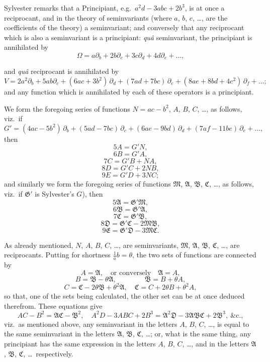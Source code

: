 \documentclass[11pt]{article}
\begin{document}
Sylvester remarks that a Principiant, e.g.\ $a^2 d - 3 a b c + 2 b^3$, is at once a reciprocant, and in the theory of seminvariants (where $a$, $b$, $c$, \ldots, are the coefficients of the theory) a seminvariant; and conversely that any reciprocant which is also a seminvariant is a principiant: \emph{qu\^a} seminvariant, the principiant is annihilated by
\[
\Omega = a\partial_b + 2 b\partial_c + 3 c\partial_d + 4 d\partial_e + \ldots,
\]

and \emph{qu\^a} reciprocant is annihilated by
\[
V = 2 a^2\partial_b + 5 a b\partial_c + (6 a c + 3 b^2)\,\partial_d + (7 a d + 7 b c)\,\partial_e + (8 a e + 8 b d + 4 c^2)\,\partial_f + \ldots;
\]
and any function which is annihilated by each of these operators is a principiant.

We form the foregoing series of functions $N = a c - b^2$, $A$, $B$, $C$, \ldots, as follows, viz.\ if
\[
G' = (4 a c - 5 b^2)\,\partial_b + (5 a d - 7 b c)\,\partial_c + (6 a e - 9 b d)\,\partial_d + (7 a f - 11 b e)\,\partial_e + \ldots,
\]
then
\[
5 A = G' N,
\]
\[
6 B = G' A,
\]
\[
7 C = G' B + N A,
\]
\[
8 D = G' C + 2 N B,
\]
\[
9 E = G' D + 3 N C;
\]
and similarly we form the foregoing series of functions $\mathfrak{M}$, $\mathfrak{A}$, $\mathfrak{B}$, $\mathfrak{C}$, \ldots, as follows, viz.\ if
$\mathfrak{G}'$ is Sylvester's $G$), then
\[
5\mathfrak{A} = \mathfrak{G}'\mathfrak{M},
\]
\[
6\mathfrak{B} = \mathfrak{G}'\mathfrak{A},
\]
\[
7\mathfrak{C} = \mathfrak{G}'\mathfrak{B},
\]
\[
8\mathfrak{D} = \mathfrak{G}'\mathfrak{C} - 2\mathfrak{M}\mathfrak{B},
\]
\[
9\mathfrak{E} = \mathfrak{G}'\mathfrak{D} - 3\mathfrak{M}\mathfrak{C}.
\]

As already mentioned, $N$, $A$, $B$, $C$, \ldots, are seminvariants, $\mathfrak{M}$, $\mathfrak{A}$, $\mathfrak{B}$, $\mathfrak{C}$, \ldots, are reciprocants. Putting for shortness $\tfrac{1}{a} b = \theta$, the two sets of functions are connected by
\[
A = \mathfrak{A},\quad \text{or conversely}\quad \mathfrak{A} = A,
\]
\[
B = \mathfrak{B} - \theta\mathfrak{A},\qquad\qquad \mathfrak{B} = B + \theta A,
\]
\[
C = \mathfrak{C} - 2\theta\mathfrak{B} + \theta^2\mathfrak{A},\quad \mathfrak{C} = C + 2\theta B + \theta^2 A,
\]
so that, one of the sets being calculated, the other set can be at once deduced therefrom. These equations give
\[
A C - B^2 = \mathfrak{A}\mathfrak{C} - \mathfrak{B}^2,\quad A^2 D - 3 A B C + 2 B^3 = \mathfrak{A}^2 \mathfrak{D} - 3\mathfrak{A}\mathfrak{B}\mathfrak{C} + 2\mathfrak{B}^3,\ \&\mathrm{c}.,
\]
viz.\ as mentioned above, any seminvariant in the letters $A$, $B$, $C$, \ldots, is equal to the same seminvariant in the letters $\mathfrak{A}$, $\mathfrak{B}$, $\mathfrak{C}$, \ldots; or, what is the same thing, any principiant has the same expression in the letters $A$, $B$, $C$, \ldots, and in the letters $\mathfrak{A}$, $\mathfrak{B}$, $\mathfrak{C}$, \ldots\ respectively.
\end{document}
